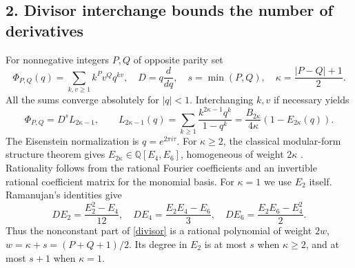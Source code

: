 \documentclass[11pt]{article}
\newcommand{\Q}{\mathbb Q}
\begin{document}
\subsection*{2. Divisor interchange bounds the number of derivatives}
For nonnegative integers $P,Q$ of opposite parity set
\[
 \Phi_{P,Q}(q)=\sum_{k,v\ge1}k^Pv^Qq^{kv},\quad
 D=q\frac d{dq},\quad
 s=\min(P,Q),\quad \kappa=\frac{|P-Q|+1}{2}.
\]
All the sums converge absolutely for $|q|<1$. Interchanging $k,v$
if necessary yields
\begin{equation}\label{divisor}
 \Phi_{P,Q}=D^sL_{2\kappa-1},\qquad
 L_{2\kappa-1}(q)=\sum_{k\ge1}\frac{k^{2\kappa-1}q^k}{1-q^k}
   =\frac{B_{2\kappa}}{4\kappa}(1-E_{2\kappa}(q)).
\end{equation}
The Eisenstein normalization is $q=e^{2\pi i\tau}$.
For $\kappa\ge2$, the classical modular-form structure theorem
gives $E_{2\kappa}\in\Q[E_4,E_6]$, homogeneous of weight $2\kappa$
\cite[Proposition 4]{Z}. Rationality follows from the rational
Fourier coefficients and an invertible rational coefficient matrix
for the monomial basis. For $\kappa=1$ we use $E_2$ itself.
Ramanujan's identities \cite[Section 7]{R} give
\begin{equation}\label{D}
 DE_2=\frac{E_2^2-E_4}{12},\quad
 DE_4=\frac{E_2E_4-E_6}{3},\quad
 DE_6=\frac{E_2E_6-E_4^2}{2}.
\end{equation}
Thus the nonconstant part of \eqref{divisor} is a rational
polynomial of weight $2w$, $w=\kappa+s=(P+Q+1)/2$.
Its degree in $E_2$ is at most $s$ when $\kappa\ge2$, and at most
$s+1$ when $\kappa=1$.
\end{document}
